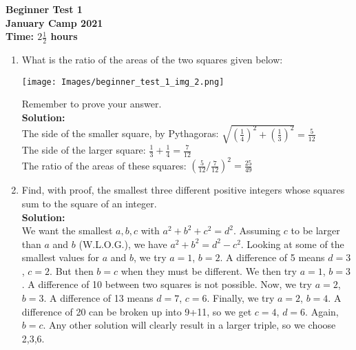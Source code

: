 \documentclass{article}
\begin{document}
\thispagestyle{empty}

\begin{center}
  \textbf{\Large Beginner Test 1}
  \\ \vspace{1em}
  \textbf{\large January Camp 2021}
  \\ \vspace{1em}
  \textbf{\large Time: $2\frac{1}{2}$ hours}
\end{center}

\vspace{24pt}

\begin{enumerate}[1.]


\item What is the ratio of the areas of the two squares given below:
\begin{center}
	\texttt{[image: Images/beginner\_test\_1\_img\_2.png]}	
\end{center}
Remember to prove your answer.\\%

\textbf{Solution:}\\
The side of the smaller square, by Pythagoras: $\sqrt{(\frac{1}{4})^2+(\frac{1}{3})^2}=\frac{5}{12}$\\
The side of the larger square: $\frac{1}{3}+\frac{1}{4}=\frac{7}{12}$\\
The ratio of the areas of these squares: $(\frac{5}{12}/\frac{7}{12})^2=\frac{25}{49}$\\



\item Find, with proof, the smallest three different positive integers whose squares sum to the square of an integer.\\ %

\textbf{Solution:}\\
We want the smallest $a,b,c$ with $a^2+b^2+c^2=d^2$. Assuming $c$ to be larger than $a$ and $b$ (W.L.O.G.), we have $a^2+b^2=d^2-c^2$. Looking at some of the smallest values for $a$ and $b$, we try $a=1$, $b=2$. A difference of 5 means $d=3$, $c=2$. But then $b=c$ when they must be different. We then try $a=1$, $b=3$. A difference of 10 between two squares is not possible. Now, we try $a=2$, $b=3$. A difference of 13 means $d=7$, $c=6$. Finally, we try $a=2$, $b=4$. A difference of 20 can be broken up into 9+11, so we get $c=4$, $d=6$. Again, $b=c$. Any other solution will clearly result in a larger triple, so we choose 2,3,6.\\




\end{enumerate}
\end{document}
